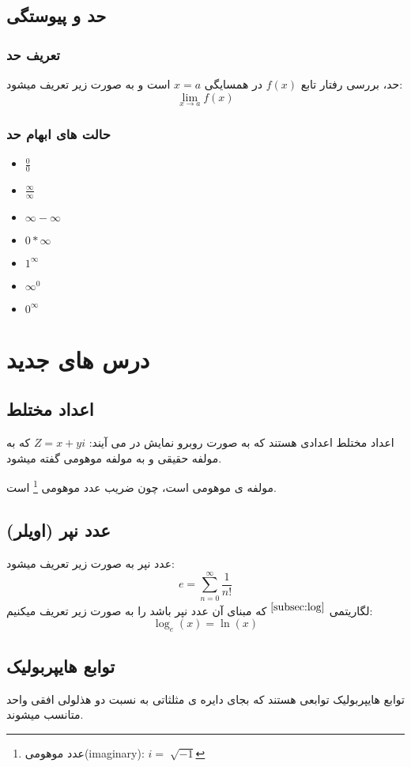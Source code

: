 \documentclass[12pt, a4paper, oneside]{article}
\begin{document}
\subsection{حد و پیوستگی}
\subsubsection{تعریف حد}
حد، بررسی رفتار تابع $f(x)$ در همسایگی $x=a$ است و به صورت زیر تعریف میشود:
\[ \lim_{x \to a} f(x)\]
\subsubsection{حالت های ابهام حد}
\begin{itemize}
    \item $\frac{ 0 }{ 0 }$
    \item $\frac{ \infty }{ \infty }$
    \item $\infty - \infty$
    \item $0* \infty$
    \item $1^\infty$
    \item $\infty^0$
    \item $0^\infty$
\end{itemize}

\section{درس های جدید}
\subsection{اعداد مختلط}
اعداد مختلط اعدادی هستند که به صورت روبرو نمایش در می آیند: $Z = x + yi$
که به  مولفه حقیقی و به  مولفه موهومی گفته میشود.

 مولفه ی موهومی است، چون ضریب عدد موهومی \footnote[2]{عدد موهومی(imaginary): $i=\sqrt[]{-1}$} است.
\subsection{عدد نپر (اویلر)}
عدد نپر به صورت زیر تعریف میشود:
\[e=\sum_{n=0}^{\infty} \frac{1}{n!}\]
لگاریتمی
{$\overset{\ref{subsec:log}}{}$}
 که مبنای آن عدد نپر باشد را به صورت زیر تعریف میکنیم: 
\[\log_e (x) = \ln (x)\]
\subsection{توابع هایپربولیک}
توابع هایپربولیک توابعی هستند که بجای دایره ی مثلثاتی به نسبت دو هذلولی افقی واحد متانسب میشوند.
 
\end{document}
